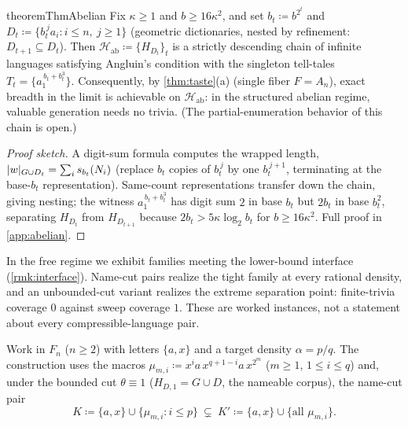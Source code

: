 \documentclass[11pt]{article}
\numberwithin{equation}{section}
\newcommand{\mc}[1]{\mathcal{#1}}
\newcommand{\defeq}{\coloneqq}
\DeclarePairedDelimiter{\abs}{\lvert}{\rvert}
\newcommand{\Amb}{F}
\newcommand{\Hcal}{\mc{H}}
\newcommand{\Comp}[1]{H_{#1}}
\theoremstyle{plain}
\theoremstyle{definition}
\theoremstyle{remark}
\begin{document}
\begin{restatable}{theorem}{ThmAbelian}\label{thm:abelian}
Fix $\kappa \ge 1$ and $b \ge 16\kappa^2$, and set $b_t \defeq b^{2^t}$ and $D_t \defeq \{
b_t^{\,j} a_i : i \le n,\ j \ge 1 \}$ (geometric dictionaries, nested by refinement: $D_{t+1}
\subseteq D_t$). Then $\Hcal_{\mathrm{ab}} \defeq \{ \Comp{D_t} \}_t$ is a strictly descending
chain of infinite languages satisfying Angluin's condition with the singleton tell-tales $T_t
= \{ a_1^{\,b_t + b_t^3} \}$. Consequently, by \cref{thm:taste}(a) (single fiber $\Amb =
A_n$), exact breadth in the limit is achievable on $\Hcal_{\mathrm{ab}}$: in the structured
abelian regime, valuable generation needs no trivia. \textup{(}The partial-enumeration
behavior of this chain is open.\textup{)}
\end{restatable}

\begin{proof}[Proof sketch]
A digit-sum formula computes the wrapped length, $\abs{w}_{G \cup D_t} = \sum_i s_{b_t}(N_i)$
(replace $b_t$ copies of $b_t^{\,j}$ by one $b_t^{\,j+1}$, terminating at the base-$b_t$
representation). Same-count representations transfer down the chain, giving nesting; the
witness $a_1^{\,b_t + b_t^3}$ has digit sum $2$ in base $b_t$ but $2 b_t$ in base $b_t^2$,
separating $\Comp{D_t}$ from $\Comp{D_{t+1}}$ because $2 b_t > 5 \kappa \log_2 b_t$ for $b \ge
16 \kappa^2$. Full proof in \cref{app:abelian}.
\end{proof}

In the free regime we exhibit families meeting the lower-bound interface
(\cref{rmk:interface}). Name-cut pairs realize the tight family at every rational density, and
an unbounded-cut variant realizes the extreme separation point: finite-trivia coverage $0$
against sweep coverage $1$. These are worked instances, not a statement about every
compressible-language pair.

Work in $F_n$ ($n \ge 2$) with letters $\{a, x\}$ and a target density $\alpha = p/q$. The
construction uses the macros $\mu_{m,i} \defeq x^i a\, x^{q+1-i} a\, x^{2^m}$ ($m \ge 1$, $1
\le i \le q$) and, under the bounded cut $\theta \equiv 1$ ($\Comp{D,1} = G \cup D$, the
nameable corpus), the name-cut pair
\begin{equation}\label{eq:namecut}
  K \defeq \{a, x\} \cup \{ \mu_{m,i} : i \le p\}
  \ \subsetneq\
  K' \defeq \{a, x\} \cup \{ \text{all } \mu_{m,i} \}.
\end{equation}
\end{document}
